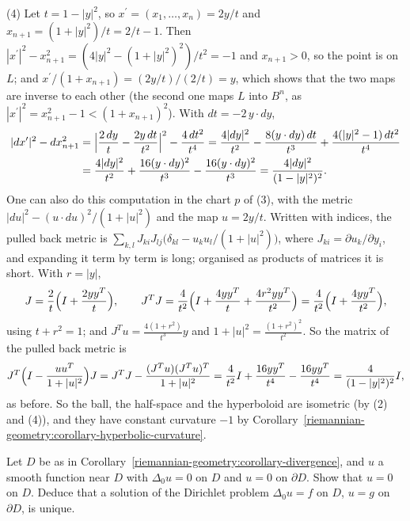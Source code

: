 \begin{solution}
(4) Let $t = 1 - |y|^2$, so $x^{\prime} = (x_1, \ldots, x_n) = 2y/t$ and $x_{n+1} = (1 + |y|^2)/t = 2/t - 1$. Then $|x^{\prime}|^2 - x_{n+1}^2 = (4|y|^2 - (1 + |y|^2)^2)/t^2 = -1$ and $x_{n+1} > 0$, so the point is on $L$;
and $x^{\prime}/(1 + x_{n+1}) = (2y/t)/(2/t) = y$, which shows that the two maps are inverse to each other (the second one maps $L$ into $B^n$, as $|x^{\prime}|^2 = x_{n+1}^2 - 1 < (1 + x_{n+1})^2$). With
$dt = -2\,y \cdot dy$,
\[
\begin{aligned}
|dx^{\prime}|^2 - dx_{n+1}^2 &= \Bigl|\frac{2\,dy}{t} - \frac{2y\,dt}{t^2}\Bigr|^2 - \frac{4\,dt^2}{t^4} = \frac{4|dy|^2}{t^2} - \frac{8(y \cdot dy)\,dt}{t^3} + \frac{4(|y|^2 - 1)\,dt^2}{t^4}\\
&= \frac{4|dy|^2}{t^2} + \frac{16(y \cdot dy)^2}{t^3} - \frac{16(y \cdot dy)^2}{t^3} = \frac{4|dy|^2}{(1 - |y|^2)^2} .
\end{aligned}
\]
One can also do this computation in the chart $p$ of (3), with the metric $|du|^2 - (u \cdot du)^2/(1 + |u|^2)$ and the map $u = 2y/t$. Written with indices, the pulled back metric is
$\sum_{k,l}J_{ki}J_{lj}\bigl(\delta_{kl} - u_ku_l/(1 + |u|^2)\bigr)$, where $J_{ki} = \partial u_k/\partial y_i$, and expanding it term by term is long; organised as products of matrices it is short. With $r = |y|$,
\[
J = \frac2t\Bigl(I + \frac{2yy^T}{t}\Bigr), \qquad J^TJ = \frac{4}{t^2}\Bigl(I + \frac{4yy^T}{t} + \frac{4r^2yy^T}{t^2}\Bigr) = \frac{4}{t^2}\Bigl(I + \frac{4yy^T}{t^2}\Bigr),
\]
using $t + r^2 = 1$; and $J^Tu = \frac{4(1 + r^2)}{t^3}y$ and $1 + |u|^2 = \frac{(1 + r^2)^2}{t^2}$. So the matrix of the pulled back metric is
\[
J^T\Bigl(I - \frac{uu^T}{1 + |u|^2}\Bigr)J = J^TJ - \frac{(J^Tu)(J^Tu)^T}{1 + |u|^2} = \frac{4}{t^2}I + \frac{16yy^T}{t^4} - \frac{16yy^T}{t^4} = \frac{4}{(1 - |y|^2)^2}I,
\]
as before. So the ball, the half-space and the hyperboloid are isometric (by (2) and (4)), and they have constant curvature $-1$ by Corollary~\ref{riemannian-geometry:corollary-hyperbolic-curvature}.
\end{solution}

\begin{exercise}\label{riemannian-geometry:exercise-dirichlet-uniqueness}
Let $D$ be as in Corollary~\ref{riemannian-geometry:corollary-divergence}, and $u$ a smooth function near $D$ with $\Delta_0u = 0$ on $D$ and $u = 0$ on $\partial D$. Show that $u = 0$ on $D$. Deduce that a solution of
the Dirichlet problem $\Delta_0u = f$ on $D$, $u = g$ on $\partial D$, is unique.
\end{exercise}

